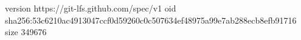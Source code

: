 version https://git-lfs.github.com/spec/v1
oid sha256:53c6210ac4913047ccf0d59260c0c507634ef48975a99e7ab288ecb8efb91716
size 349676
